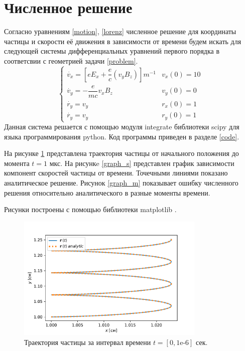 \documentclass[a4paper]{article}
\begin{document}
\section{Численное решение}
Согласно уравнениям \eqref{motion}, \eqref{lorenz} численное решение для координаты частицы и скорости её движения в зависимости от времени будем искать для следующей системы дифференциальных уравнений первого порядка в соответсвии с геометрией задачи \ref{problem}.
\begin{equation}
	\begin{cases}
		\dot{v_x} = \left[eE_x + \dfrac{e}{c}\left(v_yB_z\right)\right]m^{-1}	
											& 	v_x(0) = 10 \\[10pt]
		\dot{v_y} = -\dfrac{e}{mc} v_x B_z	&	v_y(0) = 0 \\[10pt]
		\dot{r_y} = v_y						&	r_x(0) = 1 \\[10pt]
		\dot{r_y} = v_y						&	r_y(0) = 1 
	\end{cases}
\end{equation}
Данная система решается с помощью модуля integrate \cite{web:scipy.integrate} библиотеки scipy  для языка программирования python. Код программы приведен в разделе \ref{code}. 

На рисунке \ref{graph_t} представлена траектория частицы от начального положения до момента $t = 1$ мкс. На рисункe \ref{graph_s} представлен график зависимости компонент скоростей частицы от времени. Точечными линиями показано аналитическое решение.  Рисунок \ref{graph_m} показывает ошибку численного решения относительно аналитического в разные моменты времени.

Рисунки построены с помощью библиотеки matplotlib \cite{web:matplotlib}.
\begin{figure}
	\centering
	\includegraphics[width=0.8\textwidth]{plotTrajectory.pdf}
	\caption{Траектория частицы за интервал времени $t = [0, 1\text{e-}6]$ сек.}
	\label{graph_t}
\end{figure}
\end{document}
